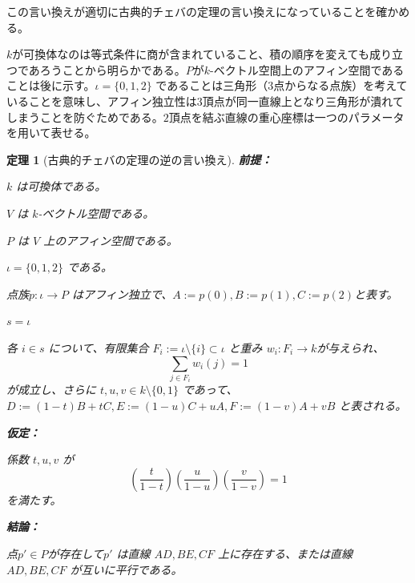 \documentclass[a4paper,12pt]{bxjsbook}
\newlength{\customindent}
\newenvironment{body}{
  \par
  \begingroup
  \setlength{\leftskip}{\customindent}
  \setlength{\rightskip}{0pt}
  \setlength{\parindent}{1em}
  \setlength{\displayindent}{\customindent}
  \setlength{\displaywidth}{\dimexpr\linewidth-\customindent\relax}
}{
  \par
  \endgroup
}
\theoremstyle{theorem}
\newtheorem{theorem}{定理}[chapter]
\begin{document}
    \begin{body}
        \indent この言い換えが適切に古典的チェバの定理の言い換えになっていることを確かめる。

        \indent $k$が可換体なのは等式条件に商が含まれていること、積の順序を変えても成り立つであろうことから明らかである。$P$が$k$-ベクトル空間上のアフィン空間であることは後に示す。$\iota = \{0,1,2\}$ であることは三角形（$3$点からなる点族）を考えていることを意味し、アフィン独立性は$3$頂点が同一直線上となり三角形が潰れてしまうことを防ぐためである。$2$頂点を結ぶ直線の重心座標は一つのパラメータを用いて表せる。
    \end{body}
    
    \begin{theorem}[古典的チェバの定理の逆の言い換え]

        \noindent\textbf{前提：}\par
        \begin{theoremenumerate}[label=(P\arabic*), leftmargin=4em, topsep=2pt, partopsep=0pt, itemsep=0pt, parsep=0pt]
            \item $k$ は可換体である。
            \item $V$ は $k$-ベクトル空間である。
            \item $P$ は $V$ 上のアフィン空間である。
            \item $\iota = \{0,1,2\}$ である。
            \item 点族$p:\iota \to P$ はアフィン独立で、$A:=p(0), B:=p(1), C:=p(2)$と表す。
            \item $s = \iota$          
            \item 各 $i\in s$ について、有限集合 $F_i:=\iota\setminus\{i\}\subset \iota$ と重み $w_i:F_i\to k$が与えられ、
            \[
            \sum_{j\in F_i} w_i(j)=1
            \]
            が成立し、さらに $t,u,v \in k \setminus \{0,1\}$ であって、$D:=(1-t)B+tC, E:=(1-u)C+uA, F:=(1-v)A+vB$ と表される。
        \end{theoremenumerate}
    
        \noindent\textbf{仮定：}\par
        \begin{theoremenumerate}[label=(A\arabic*), leftmargin=4em, topsep=2pt, partopsep=0pt, itemsep=0pt, parsep=0pt]
            \item 係数 $t,u,v$ が
            \[
            \left(\frac{t}{1-t}\right)\left(\frac{u}{1-u}\right)\left(\frac{v}{1-v}\right)=1
            \]
            を満たす。
        \end{theoremenumerate}
    
        \noindent\textbf{結論：}\par
        \begin{theoremenumerate}[label=(\roman*), leftmargin=4em, topsep=2pt, partopsep=0pt, itemsep=0pt, parsep=0pt]
            \item 点$p' \in P$が存在して$p'$ は直線 $AD, BE, CF$ 上に存在する、または直線 $AD, BE, CF$ が互いに平行である。
        \end{theoremenumerate}
    \end{theorem}
\end{document}
